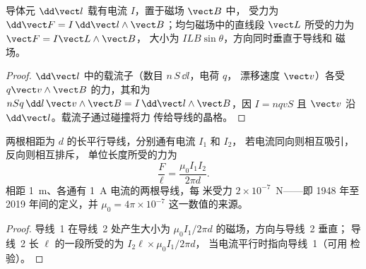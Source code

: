 \begin{theorem}[拉普拉斯力]\label{thm:b1:magnetostatics:laplace}
导体元 $\dd\vect l$ 载有电流 $I$，置于磁场 $\vect B$ 中，
受力为 $\dd\vect F = I\,\dd\vect l\wedge\vect B$；均匀磁场中的直线段
$\vect L$ 所受的力为 $\vect F = I\vect L\wedge\vect B$，
大小为 $ILB\sin\theta$，方向同时垂直于导线和
磁场。
\end{theorem}

\begin{proof}
$\dd\vect l$ 中的载流子（数目 $n\,S\,\dd l$，电荷 $q$，
漂移速度 $\vect v$）各受 $q\vect v\wedge\vect B$ 的力，其和为
$nSq\,\dd l\,\vect v\wedge\vect B = I\,\dd\vect l\wedge\vect B$，因 $I = nqvS$
且 $\vect v$ 沿 $\dd\vect l$。载流子通过碰撞将力
传给导线的晶格。
\end{proof}

\begin{proposition}[平行导线间的作用力]\label{prop:b1:magnetostatics:parallel}
两根相距为 $d$ 的长平行导线，分别通有电流 $I_1$ 和 $I_2$，
若电流同向则相互吸引，反向则相互排斥，
单位长度所受的力为
\[
\frac{F}{\ell} = \frac{\mu_0I_1I_2}{2\pi d} .
\]
相距 \qty{1}{m}、各通有 \qty{1}{A} 电流的两根导线，每
米受力 $2 \times 10^{-7}$~N——即 1948 年至 2019 年间的定义，并
$\mu_0 = 4\pi \times 10^{-7}$ 这一数值的来源。
\end{proposition}

\begin{proof}
导线~1 在导线~2 处产生大小为 $\mu_0I_1/2\pi d$ 的磁场，方向与导线~2 垂直；
导线~2 长 $\ell$ 的一段所受的为 $I_2\ell \times \mu_0I_1/2\pi d$，
当电流平行时指向导线~1（可用
检验）。
\end{proof}


